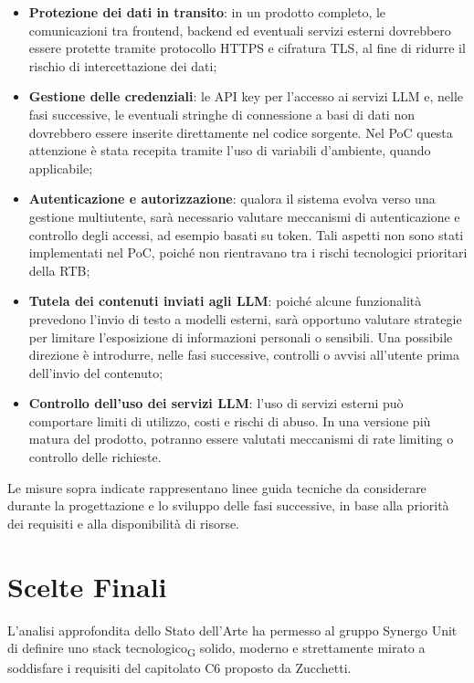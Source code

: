 \begin{itemize}
    \item \textbf{Protezione dei dati in transito}: in un prodotto completo, le comunicazioni
    tra frontend, backend ed eventuali servizi esterni dovrebbero essere protette tramite
    protocollo HTTPS e cifratura TLS, al fine di ridurre il rischio di intercettazione dei dati;

    \item \textbf{Gestione delle credenziali}: le API key per l'accesso ai servizi LLM e, nelle
    fasi successive, le eventuali stringhe di connessione a basi di dati non dovrebbero essere
    inserite direttamente nel codice sorgente. Nel PoC questa attenzione è stata recepita
    tramite l'uso di variabili d'ambiente, quando applicabile;

    \item \textbf{Autenticazione e autorizzazione}: qualora il sistema evolva verso una gestione
    multiutente, sarà necessario valutare meccanismi di autenticazione e controllo degli
    accessi, ad esempio basati su token. Tali aspetti non sono stati implementati nel PoC,
    poiché non rientravano tra i rischi tecnologici prioritari della RTB;

    \item \textbf{Tutela dei contenuti inviati agli LLM}: poiché alcune funzionalità prevedono
    l'invio di testo a modelli esterni, sarà opportuno valutare strategie per limitare
    l'esposizione di informazioni personali o sensibili. Una possibile direzione è introdurre,
    nelle fasi successive, controlli o avvisi all'utente prima dell'invio del contenuto;

    \item \textbf{Controllo dell'uso dei servizi LLM}: l'uso di servizi esterni può comportare
    limiti di utilizzo, costi e rischi di abuso. In una versione più matura del prodotto,
    potranno essere valutati meccanismi di rate limiting o controllo delle richieste.
\end{itemize}

Le misure sopra indicate rappresentano linee guida tecniche da considerare durante la progettazione e lo sviluppo
delle fasi successive, in base alla priorità dei requisiti e alla disponibilità di risorse.

\section{Scelte Finali}
L’analisi approfondita dello Stato dell’Arte ha permesso al gruppo Synergo Unit di definire uno stack tecnologico\textsubscript{G} solido, moderno e strettamente mirato a soddisfare i requisiti del capitolato C6 proposto da Zucchetti.

